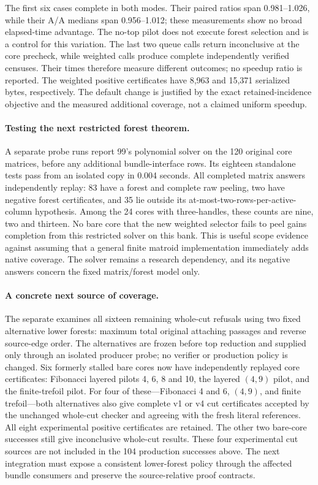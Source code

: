 

The first six cases complete in both modes. Their paired ratios span
0.981--1.026, while their A/A medians span 0.956--1.012; these measurements
show no broad elapsed-time advantage. The no-top pilot does not execute
forest selection and is a control for this variation. The last two queue
calls return inconclusive at the core precheck, while weighted calls
produce complete independently verified censuses. Their times therefore
measure different outcomes; no speedup ratio is reported. The weighted
positive certificates have 8,963 and 15,371 serialized bytes, respectively.
The default change is justified by the exact retained-incidence objective
and the measured additional coverage, not a claimed uniform speedup.

\paragraph{Testing the next restricted forest theorem.}
A separate probe runs report 99's polynomial solver on the 120 original
core matrices, before any additional bundle-interface rows. Its eighteen
standalone tests pass from an isolated copy in 0.004 seconds. All completed
matrix answers independently replay: 83 have a forest and complete raw
peeling, two have negative forest certificates, and 35 lie outside its
at-most-two-rows-per-active-column hypothesis. Among the 24 cores with
three-handles, these counts are nine, two and thirteen. No bare core that
the new weighted selector fails to peel gains completion from this
restricted solver on this bank. This is useful scope evidence against
assuming that a general finite matroid implementation immediately adds
native coverage. The solver remains a research dependency, and its
negative answers concern the fixed matrix/forest model only.

\paragraph{A concrete next source of coverage.}
The separate  examines all sixteen
remaining whole-cut refusals using two fixed alternative lower forests:
maximum total original attaching passages and reverse source-edge order.
The alternatives are frozen before top reduction and supplied only through
an isolated producer probe; no verifier or production policy is changed.
Six formerly stalled bare cores now have independently replayed core
certificates: Fibonacci layered pilots 4, 6, 8 and 10, the layered $(4,9)$
pilot, and the finite-trefoil pilot. For four of these---Fibonacci 4 and 6,
$(4,9)$, and finite trefoil---both alternatives also give complete v1 or v4
cut certificates accepted by the unchanged whole-cut checker and agreeing
with the fresh literal references. All eight experimental positive
certificates are retained. The other two bare-core successes still give
inconclusive whole-cut results. These four experimental cut sources are
not included in the 104 production successes above. The next integration
must expose a consistent lower-forest policy through the affected bundle
consumers and preserve the source-relative proof contracts.

